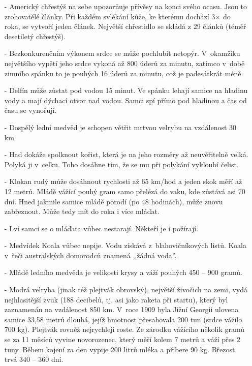 \begin{multicols}{2}
\begin{itemize}
\itemsep -3pt

\item[-] Americký chřestýš na sebe upozorňuje přívěsy na konci svého 
ocasu. Jsou to zrohovatělé články. Při každém svlékání kůže, 
ke kterému dochází 3$\times$ do roka, se vytvoří jeden článek. Největší
chřestidlo se skládá z 29 článků (téměř desetiletý chřestýš).

\item[-] Bezkonkurenčním výkonem srdce se může pochlubit netopýr. V~okamžiku 
největšího vypětí jeho srdce vykoná až 800 úderů za minutu, zatímco 
v~době zimního spánku to je pouhých 16 úderů za minutu, 
což je padesátkrát méně.

\item[-] Delfín může zůstat pod vodou 15 minut. Ve spánku lehají samice 
na hladinu vody a mají dýchací otvor nad vodou. Samci spí přímo 
pod hladinou a čas od času se vynořují.

\item[-] Dospělý lední medvěd je schopen větřit mrtvou velrybu na vzdálenost 
30 km.

\item[-] Had dokáže spolknout kořist, která je na jeho rozměry až neuvěřitelně 
velká. Polyká ji v~celku. Toho dosáhne tím, že se mu při 
polykání vykloubí čelist.

\item[-] Klokan rudý může dosáhnout rychlosti až 65 km/hod a jeden skok 
měří až 12 metrů. Mládě vážící pouhý gram samo přelézá do vaku, 
kde zůstává asi 70 dní. Hned jakmile samice mládě porodí (po 
48 hodinách), může znovu zabřeznout. Může tedy mít do roka i 
více mláďat.

\item[-] Lví samci se o mláďata vůbec nestarají. Někteří je i požírají.

\item[-] Medvídek Koala vůbec nepije. Vodu získává z~blahovičníkových 
listů. Koala v~řeči australských domorodců znamená ,,žádná 
voda''.

\item[-] Mládě ledního medvěda je velikosti krysy a váží pouhých 
450 -- 900 gramů.

\item[-] Modrá velryba (jinak též plejtvák obrovský), největší živočich 
na zemi, vydá nejhlasitější zvuk (188 decibelů, tj. asi jako 
raketa při startu), který byl zaznamenán na vzdálenost 850 km. 
V~roce 1909 byla Jižní Georgii ulovena samice 33,58 metrů 
dlouhá, jejíž hmotnost přesahovala 200 tun (srdce vážilo 700 
kg). Plejtvák rovněž nejrychleji roste. Ze zárodku vážícího několik 
gramů se za 11 měsíců vyvine novorozenec, který měří kolem 7 
metrů a váží přes 2 tuny. Během kojení za den vypije 200 litrů 
mléka a přibere 90 kg. Březost trvá 340 -- 360 dní.


\end{itemize}
\end{multicols}
